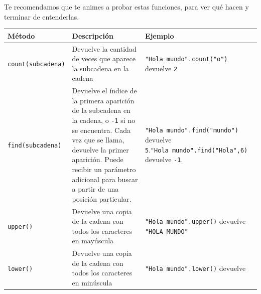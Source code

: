 \documentclass[
  letterpaper,
  DIV=11,
  numbers=noendperiod]{scrreprt}
\begin{document}
\begin{tcolorbox}[enhanced jigsaw, arc=.35mm, toptitle=1mm, colframe=quarto-callout-note-color-frame, bottomtitle=1mm, opacitybacktitle=0.6, colbacktitle=quarto-callout-note-color!10!white, leftrule=.75mm, coltitle=black, toprule=.15mm, titlerule=0mm, title=\textcolor{quarto-callout-note-color}{\faInfo}\hspace{0.5em}{Recomendación}, bottomrule=.15mm, rightrule=.15mm, colback=white, breakable, opacityback=0, left=2mm]

Te recomendamos que te animes a probar estas funciones, para ver qué
hacen y terminar de entenderlas.

\end{tcolorbox}

\begin{longtable}[]{@{}
  >{\raggedright\arraybackslash}p{}
  >{\raggedright\arraybackslash}p{}
  >{\raggedright\arraybackslash}p{}@{}}
\toprule\noalign{}
\begin{minipage}[b]{\linewidth}\raggedright
Método
\end{minipage} & \begin{minipage}[b]{\linewidth}\raggedright
Descripción
\end{minipage} & \begin{minipage}[b]{\linewidth}\raggedright
Ejemplo
\end{minipage} \\
\midrule\noalign{}
\endhead
\bottomrule\noalign{}
\endlastfoot
\texttt{count(subcadena)} & Devuelve la cantidad de veces que aparece la
subcadena en la cadena & \texttt{"Hola\ mundo".count("o")} devuelve
\texttt{2} \\
\texttt{find(subcadena)} & Devuelve el índice de la primera aparición de
la subcadena en la cadena, o \texttt{-1} si no se encuentra. Cada vez
que se llama, devuelve la primer aparición. Puede recibir un parámetro
adicional para buscar a partir de una posición particular. &
\texttt{"Hola\ mundo".find("mundo")} devuelve
\texttt{5}.\texttt{"Hola\ mundo".find("Hola",6)} devuelve
\texttt{-1}. \\
\texttt{upper()} & Devuelve una copia de la cadena con todos los
caracteres en mayúscula & \texttt{"Hola\ mundo".upper()} devuelve
\texttt{"HOLA\ MUNDO"} \\
\texttt{lower()} & Devuelve una copia de la cadena con todos los
caracteres en minúscula & \texttt{"Hola\ mundo".lower()} devuelve

\end{longtable}
\end{document}

